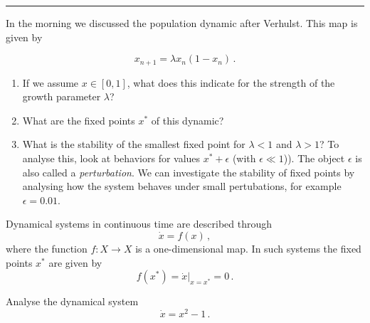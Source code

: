 

\usepackage{pstricks,pst-node,pst-tree}




  \sheet[%
  number=5,
  topic={Dynamical Systems},
    ]

\vspace{-1cm}
\noindent\rule{12cm}{0.4pt}

  \exercise[%
  topic = Population Dynamic for Discrete Time Steps
  ]


In the morning we discussed the population dynamic after Verhulst. This map is given by

  \begin{equation}
      x_{n+1} = \lambda x_n(1-x_n)\,.
  \end{equation}


  \begin{enumerate}
      \item If we assume $x\in [0,1]$, what does this indicate for the strength of the growth parameter $\lambda$?
      \item What are the fixed points $x^*$ of this dynamic?
      \item What is the stability of the smallest fixed point for $\lambda<1$ and $\lambda>1$? To analyse this, look at behaviors for values $x^*+\epsilon$ (with $\epsilon\ll1$)). The object $\epsilon$ is also called a \emph{perturbation}. We can investigate the stability of fixed points by analysing how the system behaves under small pertubations, for example  $\epsilon=0.01$.
  \end{enumerate}
    
  \exercise[%
  topic = Dynamic System in Continuous Time 
  ]


Dynamical systems in continuous time are described through 
  \begin{equation}
      \dot x = f(x)\,,
  \end{equation}
 where the function $f:X\rightarrow X$ is a one-dimensional map. In such systems the fixed points $x^*$  are given by 
    \begin{equation}
      f(x^*) = \dot x|_{x=x^*} = 0\,.
  \end{equation}
  
  \subexercise

Analyse the dynamical system
  \begin{equation}
      \dot x = x^2 -1\,.
  \end{equation}
  
